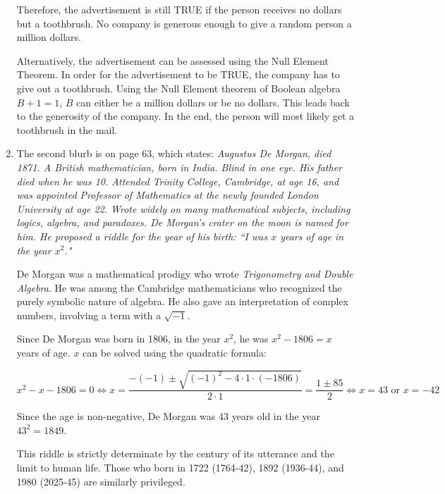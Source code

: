 \documentclass[12pt]{article}
\begin{document}
\begin{enumerate}
    Therefore, the advertisement is still TRUE if the person receives no dollars but a toothbrush. No company is generous enough to give a random person a million dollars.

    Alternatively, the advertisement can be assessed using the Null Element Theorem. In order for the advertisement to be TRUE, the company has to give out a toothbrush. Using the Null Element theorem of Boolean algebra $B + 1 = 1$, $B$ can either be a million dollars or be no dollars. This leads back to the generosity of the company. In the end, the person will most likely get a toothbrush in the mail.

    \item The second blurb is on page 63, which states: \textit{Augustus De Morgan, died 1871. A British mathematician, born in India. Blind in one eye. His father died when he was 10. Attended Trinity College, Cambridge, at age 16, and was appointed Professor of Mathematics at the newly founded London University at age 22. Wrote widely on many mathematical subjects, including logics, algebra, and paradoxes. De Morgan's crater on the moon is named for him. He proposed a riddle for the year of his birth: ``I was $x$ years of age in the year $x^2$."}

    De Morgan was a mathematical prodigy who wrote \textit{Trigonometry and Double Algebra}. He was among the Cambridge mathematicians who recognized the purely symbolic nature of algebra. He also gave an interpretation of complex numbers, involving a term with a $\sqrt{-1}$.\cite{WikipediaDeMorgan}

    Since De Morgan was born in 1806, in the year $x^2$, he was $x^2 - 1806 = x$ years of age. $x$ can be solved using the quadratic formula:

    \begin{equation} \label{equation:8}
        x^2 - x - 1806 = 0
        \Leftrightarrow x = \frac{-(-1) \pm \sqrt{(-1)^2 - 4 \cdot 1 \cdot (-1806)}}{2 \cdot 1} = \frac{1 \pm 85}{2}
        \Leftrightarrow x = 43\text{ or }x = -42
    \end{equation}

    Since the age is non-negative, De Morgan was 43 years old in the year $43^2 = 1849$.

    This riddle is strictly determinate by the century of its utterance and the limit to human life. Those who born in 1722 (1764-42), 1892 (1936-44), and 1980 (2025-45) are similarly privileged.\cite{WikipediaDeMorgan}
\end{enumerate}
\end{document}
